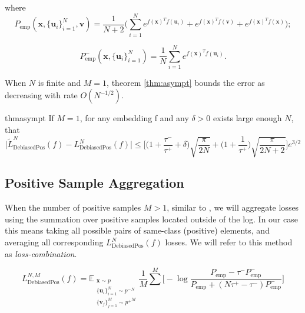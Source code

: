 \documentclass{article}
\begin{document}
where
\begin{equation} \label{eq:13}
P_{\text{emp}} (\textbf{x}, \{\textbf{u}_i\}_{i=1}^N, \textbf{v}) = \frac{1}{N+2} \bigg(\sum \limits_{i=1}^N e^{f(\textbf{x})^T f(\textbf{u}_i)} + e^{f(\textbf{x})^T f(\textbf{v})} + e^{f(\textbf{x})^T f(\textbf{x})}\bigg);
\end{equation}

\begin{equation} \label{eq:14}
P_{\text{emp}}^- (\textbf{x}, \{\textbf{u}_i\}_{i=1}^N) = \frac{1}{N} \sum \limits_{i=1}^N e^{f(\textbf{x})^T f(\textbf{u}_i)}.
\end{equation}

When $N$ is finite and $M=1$, theorem \ref{thm:asympt} bounds the error as decreasing with rate $O(N^{-1/2})$.

\begin{restatable}[]{thm}{asympt}
\label{thm:asympt}
If $M = 1$, for any embedding f and any $\delta > 0$ exists large enough $N$, that
\begin{equation} \label{eq:15}
\big|\tilde{L}_{\text{DebiasedPos}}^N (f) - L_{\text{DebiasedPos}}^N (f)\big| \leq \bigg[\bigg(1 + \frac{\tau^-}{\tau^+} + \delta\bigg) \sqrt{\frac{\pi}{2N}} + \bigg(1 + \frac{1}{\tau^+}\bigg) \sqrt{\frac{\pi}{2N + 2}}\bigg] e^{3/2}
\end{equation}
\end{restatable}

\subsection{Positive Sample Aggregation} \label{pos_aggr_theory}

When the number of positive samples $M > 1$, similar to \citep{khosla2021supervised}, we will aggregate losses using the summation over positive samples located outside of the log. In our case this means taking all possible pairs of same-class (positive) elements, and averaging all corresponding $L_{\text{DebiasedPos}}^N (f)$ losses. We will refer to this method as \textit{loss-combination}.


\begin{equation} \label{eq:16}
L_{\text{DebiasedPos}}^{N, M} (f) = \mathbb{E}_{\substack{\textbf{x} \sim p \\ \{\textbf{u}_i\}_{i=1}^N \sim {p^-}^N \\ \{\textbf{v}_j\}_{j=1}^M\sim {p^+}^M}} \frac{1}{M} \sum\limits^M \bigg[-\log \frac{P_{\text{emp}} - \tau^- P_{\text{emp}}^-}{P_{\text{emp}} + (N \tau^+ - \tau^-) P_{\text{emp}}^-}\bigg]
\end{equation}
\end{document}
